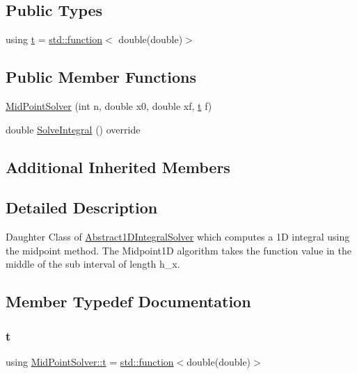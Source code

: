 \subsection*{Public Types}
\begin{DoxyCompactItemize}
\item 
using \hyperlink{class_mid_point_solver_a48db3b6c36d4edf214150e267c3d063c}{t} = \hyperlink{_tests_8cpp_a1c2dbde1ba7d93e381d4ccb9f603be16}{std\+::function}$<$ double(double)$>$
\end{DoxyCompactItemize}
\subsection*{Public Member Functions}
\begin{DoxyCompactItemize}
\item 
\hyperlink{class_mid_point_solver_afc0c085bfd86c3f17cb6dd0852ab7426}{Mid\+Point\+Solver} (int n, double x0, double xf, \hyperlink{class_abstract1_d_integral_solver_a7d8e60dfe7eb70e5c19dd71ac0b03880}{t} f)
\item 
double \hyperlink{class_mid_point_solver_a3e7224a0fb07b3ef7f5f9e7e577216cf}{Solve\+Integral} () override
\end{DoxyCompactItemize}
\subsection*{Additional Inherited Members}


\subsection{Detailed Description}
Daughter Class of \hyperlink{class_abstract1_d_integral_solver}{Abstract1\+D\+Integral\+Solver} which computes a 1D integral using the midpoint method. The Midpoint1D algorithm takes the function value in the middle of the sub interval of length h\+\_\+x. 

\subsection{Member Typedef Documentation}
\mbox{\label{class_mid_point_solver_a48db3b6c36d4edf214150e267c3d063c}} 
\subsubsection{\texorpdfstring{t}{t}}
{\footnotesize\ttfamily using \hyperlink{class_mid_point_solver_a48db3b6c36d4edf214150e267c3d063c}{Mid\+Point\+Solver\+::t} =  \hyperlink{_tests_8cpp_a1c2dbde1ba7d93e381d4ccb9f603be16}{std\+::function}$<$double(double)$>$}

